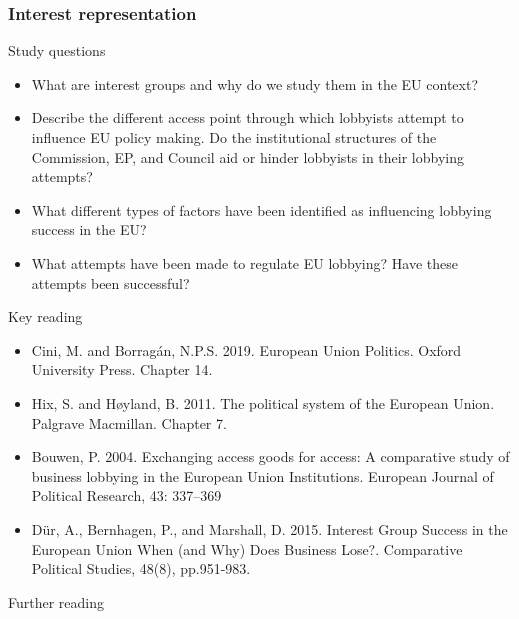 \subsubsection*{Interest representation}

Study questions

\begin{itemize}
	\item What are interest groups and why do we study them in the EU context?
	\item Describe the different access point through which lobbyists attempt to influence EU policy making. Do the institutional structures of the Commission, EP, and Council aid or hinder lobbyists in their lobbying attempts?
	\item What different types of factors have been identified as influencing lobbying success in the EU?
	\item What attempts have been made to regulate EU lobbying? Have these attempts been successful?
\end{itemize}
	
\noindent Key reading

\begin{itemize}
	\item Cini, M. and Borragán, N.P.S. 2019. European Union Politics. Oxford University Press. Chapter 14.
	\item Hix, S. and H\o yland, B. 2011. The political system of the European Union. Palgrave Macmillan. Chapter 7.
	\item Bouwen, P. 2004. Exchanging access goods for access: A comparative study of business lobbying in the European Union Institutions. European Journal of Political Research, 43: 337–369 
	\item D{\"u}r, A., Bernhagen, P., and Marshall, D. 2015. Interest Group Success in the European Union When (and Why) Does Business Lose?. Comparative Political Studies, 48(8), pp.951-983.
\end{itemize}

\noindent Further reading

